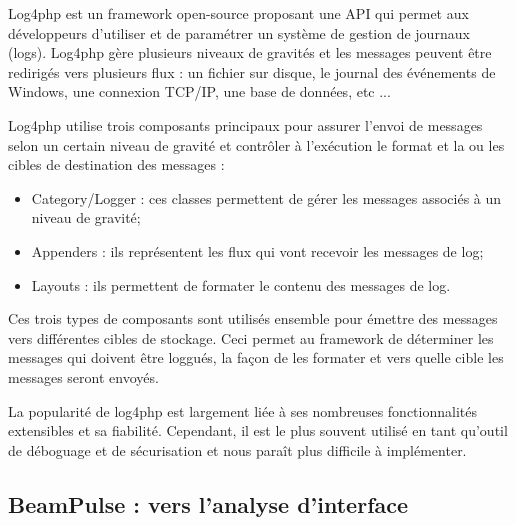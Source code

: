             Log4php est un framework open-source proposant une API qui permet aux développeurs d'utiliser et de paramétrer un système de gestion de journaux (logs). Log4php gère plusieurs niveaux de gravités et les messages peuvent être redirigés vers plusieurs flux : un fichier sur disque, le journal des événements de Windows, une connexion TCP/IP, une base de données, etc ...
        
            Log4php utilise trois composants principaux pour assurer l'envoi de messages selon un certain niveau de gravité et contrôler à l'exécution le format et la ou les cibles de destination des messages :

            \begin{itemize}
                \item Category/Logger : ces classes permettent de gérer les messages associés à un niveau de gravité;
                \item Appenders : ils représentent les flux qui vont recevoir les messages de log;
                \item Layouts : ils permettent de formater le contenu des messages de log.

            \end{itemize}

            Ces trois types de composants sont utilisés ensemble pour émettre des messages vers différentes cibles de stockage. Ceci permet au framework de déterminer les messages qui doivent être loggués, la façon de les formater et vers quelle cible les messages seront envoyés.

            La popularité de log4php est largement liée à  ses nombreuses fonctionnalités extensibles et sa fiabilité. Cependant, il est le plus souvent utilisé en tant qu'outil de déboguage et de sécurisation et nous paraît plus difficile à implémenter.
        
        \subsection{BeamPulse : vers l'analyse d'interface}
        
